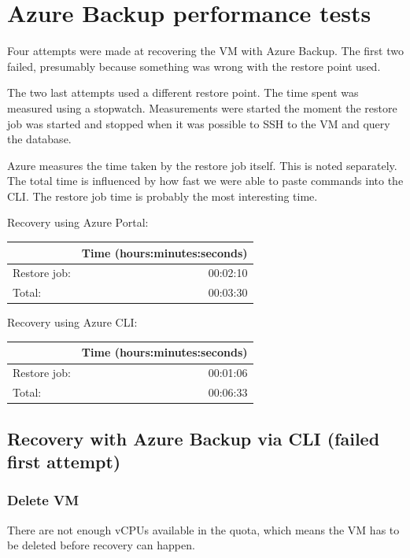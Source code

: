 \section{Azure Backup performance tests}
\label{app:chab-perf}
Four attempts were made at recovering the VM with Azure Backup.
The first two failed, presumably because something was wrong with the restore point used.

The two last attempts used a different restore point.
The time spent was measured using a stopwatch.
Measurements were started the moment the restore job was started
and stopped when it was possible to SSH to the VM and query the database.

Azure measures the time taken by the restore job itself.
This is noted separately.
The total time is influenced by how fast we were able to paste commands into the CLI.
The restore job time is probably the most interesting time.

Recovery using Azure Portal:
\begin{center}
\begin{tabular}{lr}
\hline
 & Time (hours:minutes:seconds)\\
\hline
Restore job: & 00:02:10\\
Total: & 00:03:30\\
\hline
\end{tabular}
\end{center}

Recovery using Azure CLI:
\begin{center}
\begin{tabular}{lr}
\hline
 & Time (hours:minutes:seconds)\\
\hline
Restore job: & 00:01:06\\
Total: & 00:06:33\\
\hline
\end{tabular}
\end{center}


\subsection{Recovery with Azure Backup via CLI (failed first attempt)}
\label{sec:orgb039355}
\subsubsection{Delete VM}
\label{sec:org5859260}
There are not enough vCPUs available in the quota,
which means the VM has to be deleted before recovery can happen.

